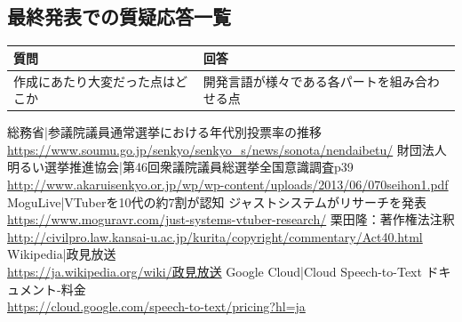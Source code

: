 \documentclass[a4paper,12pt]{jsarticle}
\begin{document}
\subsection{最終発表での質疑応答一覧}

\begin{table}[H]
	\begin{tabular}{|l|l|} \hline
		{\bf 質問} & {\bf 回答} \\ \hline \hline
		作成にあたり大変だった点はどこか & 開発言語が様々である各パートを組み合わせる点\\ \hline
	\end{tabular}
\end{table}

\begin{thebibliography}{99}
	 総務省|参議院議員通常選挙における年代別投票率の推移 \\\url{https://www.soumu.go.jp/senkyo/senkyo_s/news/sonota/nendaibetu/}
	 財団法人明るい選挙推進協会|第46回衆議院議員総選挙全国意識調査p39\\\url{http://www.akaruisenkyo.or.jp/wp/wp-content/uploads/2013/06/070seihon1.pdf}
	 MoguLive|VTuberを10代の約7割が認知 ジャストシステムがリサーチを発表	\\\url{https://www.moguravr.com/just-systems-vtuber-research/}
	 栗田隆：著作権法注釈\\\url{http://civilpro.law.kansai-u.ac.jp/kurita/copyright/commentary/Act40.html}
	 Wikipedia|政見放送 \\\url{https://ja.wikipedia.org/wiki/政見放送}
	 Google Cloud|Cloud Speech-to-Text ドキュメント-料金 \\\url{https://cloud.google.com/speech-to-text/pricing?hl=ja}

\end{thebibliography}
\end{document}
